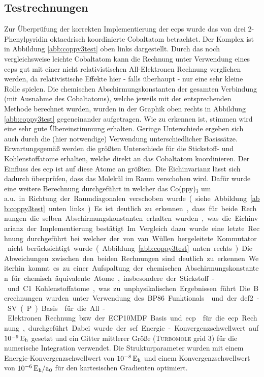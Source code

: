 	\subsection{Testrechnungen}
	Zur Überprüfung der korrekten Implementierung der \acp{ecp} wurde das von drei 2-Phenylpyridin oktaedrisch koordinierte Cobaltatom betrachtet. Der Komplex ist in Abbildung \ref{abb:coppy3test} oben links dargestellt. Durch das noch vergleichsweise leichte Cobaltatom kann die Rechnung unter Verwendung eines \acp{ecp} gut mit einer nicht relativistischen All-Elektronen Rechnung verglichen werden, da relativistische Effekte hier - falls überhaupt - nur eine sehr kleine Rolle spielen. Die chemischen Abschirmungskonstanten der gesamten Verbindung (mit Ausnahme des Cobaltatoms), welche jeweils mit der entsprechenden Methode berechnet wurden, wurden in der Graphik oben rechts in Abbildung \ref{abb:coppy3test} gegeneinander aufgetragen. Wie zu erkennen ist, stimmen wird eine sehr gute Übereinstimmung erhalten. Geringe Unterschiede ergeben sich auch durch die (hier notwendige) Verwendung unterschiedlicher Basissätze. Erwartungsgemäß werden die größten Unterschiede für die Stickstoff- und Kohlenstoffatome erhalten, welche direkt an das Cobaltatom koordinieren. Der Einfluss des \acs{ecp} ist auf diese Atome an größten. Die Eichinvarianz lässt sich dadurch überprüfen, dass das Molekül im Raum verschoben wird. Dafür wurde eine weitere Berechnung durchgeführt in welcher das Co(ppy)$_3$ um \unit[10]{a.u.} in Richtung der Raumdiagonalen verschoben wurde (siehe Abbildung \ref{abb:coppy3test} unten links). Es ist deutlich zu erkennen, dass für beide Rechnungen die selben Abschirmungskonstanten erhalten wurden, was die Eichinvarianz der Implementierung bestätigt. Im Vergleich dazu wurde eine letzte Rechnung durchgeführt bei welcher der von van Wüllen hergeleitete Kommutator nicht berücksichtigt wurde (Abbildung \ref{abb:coppy3test} unten rechts). Die Abweichungen zwischen den beiden Rechnungen sind deutlich zu erkennen. Weiterhin kommt es zu einer Aufspaltung der chemischen Abschirmungskonstanten für chemisch äquivalente Atome, insbesondere der Stickstoff- und C1 Kohlenstoffatome, was zu unphysikalischen Ergebnissen führt. Die Berechnungen wurden unter Verwendung des BP86 Funktionals\supercite{perdew1986density,becke1988density} und der def2-SV(P) Basis\supercite{weigend2005balanced} für die All-Elektronen Rechnung bzw. der ECP10MDF Basis und \ac{ecp}\supercite{dolg1987energy} für die \ac{ecp} Rechnung, durchgeführt. Dabei wurde der \ac{scf} Energie-Konvergenzschwellwert auf $\unit[10^{-9}]{E_{\textrm{h}}}$ gesetzt und ein Gitter mittlerer Größe (\textsc{Turbomole} grid 3) für die numerische Integration\supercite{treutler1995efficient} verwendet. Die Strukturparameter wurden mit einem  Energie-Konvergenzschwellwert von $\unit[10^{-8}]{E_{\textrm{h}}}$ und einem Konvergenzschwellwert von $\unit[10^{-6}]{E_{\textrm{h}}/a_0}$ für den kartesischen Gradienten optimiert. 


